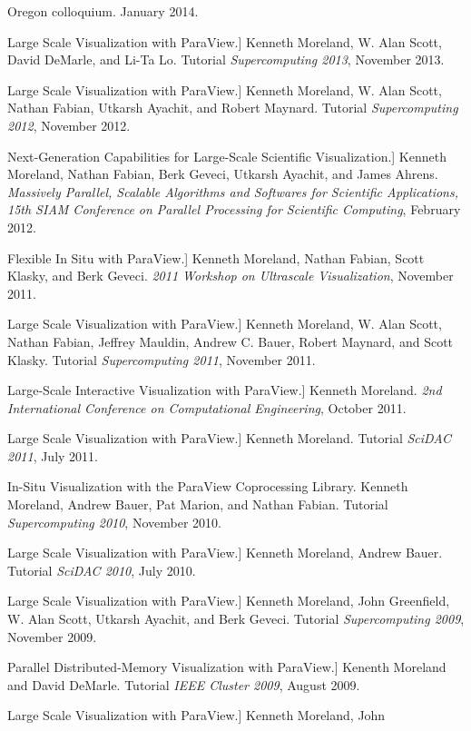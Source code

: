 \documentclass{article}
\begin{document}
\begin{enumerate}[label={[\arabic*]}]
  Oregon colloquium. January 2014.
\item Large Scale Visualization with ParaView.] Kenneth Moreland, W.
  Alan Scott, David DeMarle, and Li-Ta Lo. Tutorial
  \emph{Supercomputing 2013}, November 2013.
\item Large Scale Visualization with ParaView.] Kenneth Moreland,
  W. Alan Scott, Nathan Fabian, Utkarsh Ayachit, and Robert
  Maynard. Tutorial \emph{Supercomputing 2012}, November 2012.
\item Next-Generation Capabilities for Large-Scale Scientific
  Visualization.] Kenneth Moreland, Nathan Fabian, Berk Geveci, Utkarsh
  Ayachit, and James Ahrens. \emph{Massively Parallel, Scalable
    Algorithms and Softwares for Scientific Applications, 15th SIAM
    Conference on Parallel Processing for Scientific Computing},
  February 2012.
\item Flexible In Situ with ParaView.] Kenneth Moreland, Nathan Fabian,
  Scott Klasky, and Berk Geveci. \emph{2011 Workshop on Ultrascale
    Visualization}, November 2011.
\item Large Scale Visualization with ParaView.] Kenneth Moreland,
  W. Alan Scott, Nathan Fabian, Jeffrey Mauldin, Andrew C. Bauer,
  Robert Maynard, and Scott Klasky. Tutorial \emph{Supercomputing
    2011}, November 2011.
\item Large-Scale Interactive Visualization with ParaView.] Kenneth
  Moreland. \emph{2nd International Conference on Computational
    Engineering}, October 2011.
\item Large Scale Visualization with ParaView.] Kenneth
  Moreland. Tutorial \emph{SciDAC 2011}, July 2011.
\item In-Situ Visualization with the ParaView Coprocessing Library.
  Kenneth Moreland, Andrew Bauer, Pat Marion, and Nathan
  Fabian. Tutorial \emph{Supercomputing 2010}, November 2010.
\item Large Scale Visualization with ParaView.] Kenneth Moreland,
  Andrew Bauer. Tutorial \emph{SciDAC 2010}, July 2010.
\item Large Scale Visualization with ParaView.] Kenneth Moreland, John
  Greenfield, W. Alan Scott, Utkarsh Ayachit, and Berk Geveci. Tutorial
  \emph{Supercomputing 2009}, November 2009.
\item Parallel Distributed-Memory Visualization with ParaView.] Kenenth
  Moreland and David DeMarle. Tutorial \emph{IEEE Cluster 2009}, August
  2009.
\item Large Scale Visualization with ParaView.] Kenneth Moreland, John

\end{enumerate}
\end{document}
